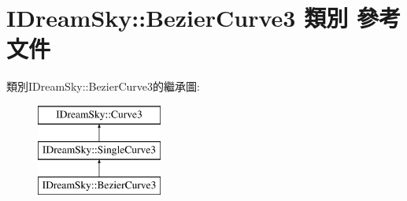 \hypertarget{class_i_dream_sky_1_1_bezier_curve3}{}\section{I\+Dream\+Sky\+:\+:Bezier\+Curve3 類別 參考文件}
\label{class_i_dream_sky_1_1_bezier_curve3}
類別\+I\+Dream\+Sky\+:\+:Bezier\+Curve3的繼承圖\+:\begin{figure}[H]
\begin{center}
\leavevmode
\includegraphics[height=3.000000cm]{class_i_dream_sky_1_1_bezier_curve3}
\end{center}
\end{figure}
